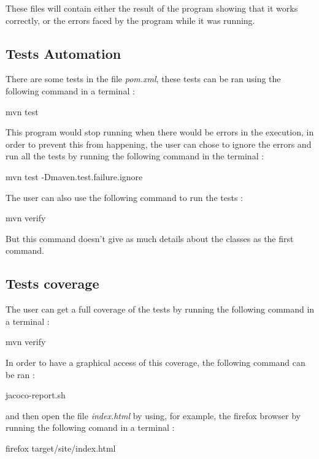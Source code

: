 These files will contain either the result of the program showing that it works correctly, or the errors faced by the program while it was running.

\subsection{Tests Automation}

There are some tests in the file \textit{pom.xml}, these tests can be ran using the following command in a terminal : 
\begin{center}
    mvn test
\end{center}
This program would stop running when there would be errors in the execution, in order to prevent this from happening, the user can chose to ignore the errors and run all the tests by running the following command in the terminal : 
\begin{center}
    mvn test -Dmaven.test.failure.ignore
\end{center}

The user can also use the following command to run the tests :
\begin{center}
    mvn verify
\end{center}
But this command doesn't give as much details about the classes as the first command.


\subsection{Tests coverage}

The user can get a full coverage of the tests by running the following command in a terminal : 
\begin{center}
    mvn verify
\end{center}

In order to have a graphical access of this coverage, the following command can be ran : 
\begin{center}
    jacoco-report.sh
\end{center}

and then open the file \textit{index.html} by using, for example, the firefox browser by running the following comand in a terminal :
\begin{center}
    firefox target/site/index.html
\end{center}

